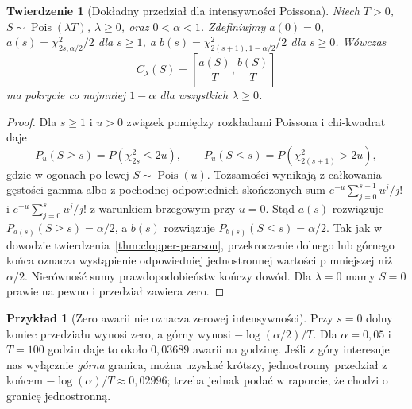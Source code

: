 \documentclass[11pt,a4paper,oneside]{report}
\numberwithin{equation}{chapter}
\theoremstyle{plain}
\newtheorem{twierdzenie}{Twierdzenie}[chapter]
\theoremstyle{definition}
\newtheorem{przyklad}{Przykład}[chapter]
\theoremstyle{remark}
\DeclareMathOperator{\Pois}{Pois}
\begin{document}
\begin{twierdzenie}[Dokładny przedział dla intensywności Poissona]
\label{thm:poisson-ci}
Niech $T>0$, $S\sim\Pois(\lambda T)$, $\lambda\ge0$,
oraz $0<\alpha<1$. Zdefiniujmy $a(0)=0$,
$a(s)=\chi^2_{2s,\alpha/2}/2$ dla $s\ge1$, a
$b(s)=\chi^2_{2(s+1),1-\alpha/2}/2$ dla $s\ge0$.
Wówczas
\[
 C_\lambda(S)=\left[\frac{a(S)}T,\frac{b(S)}T\right]
\]
ma pokrycie co najmniej $1-\alpha$ dla wszystkich
$\lambda\ge0$.
\end{twierdzenie}
\begin{proof}
Dla $s\ge1$ i $u>0$ związek pomiędzy rozkładami
Poissona i chi-kwadrat daje
\[
 P_{u}(S\ge s)=P(\chi^2_{2s}\le2u),\qquad
 P_{u}(S\le s)=P(\chi^2_{2(s+1)}>2u),
\]
gdzie w ogonach po lewej $S\sim\Pois(u)$.
Tożsamości wynikają z całkowania gęstości gamma albo
z pochodnej odpowiednich skończonych sum
$e^{-u}\sum_{j=0}^{s-1}u^j/j!$ i
$e^{-u}\sum_{j=0}^{s}u^j/j!$ z warunkiem brzegowym
przy $u=0$. Stąd $a(s)$ rozwiązuje
$P_{a(s)}(S\ge s)=\alpha/2$, a $b(s)$ rozwiązuje
$P_{b(s)}(S\le s)=\alpha/2$.
Tak jak w dowodzie twierdzenia~\ref{thm:clopper-pearson},
przekroczenie dolnego lub górnego końca oznacza wystąpienie
odpowiedniej jednostronnej wartości p mniejszej niż
$\alpha/2$. Nierówność sumy prawdopodobieństw kończy
dowód. Dla $\lambda=0$ mamy $S=0$ prawie na pewno
i przedział zawiera zero.
\end{proof}

\begin{przyklad}[Zero awarii nie oznacza zerowej intensywności]
Przy $s=0$ dolny koniec przedziału wynosi zero,
a górny wynosi $-\log(\alpha/2)/T$. Dla
$\alpha=0{,}05$ i $T=100$ godzin daje to około
$0{,}03689$ awarii na godzinę. Jeśli z góry
interesuje nas wyłącznie \emph{górna} granica, można
uzyskać krótszy, jednostronny przedział z końcem
$-\log(\alpha)/T\approx0{,}02996$; trzeba jednak
podać w raporcie, że chodzi o granicę jednostronną.
\end{przyklad}
\end{document}
